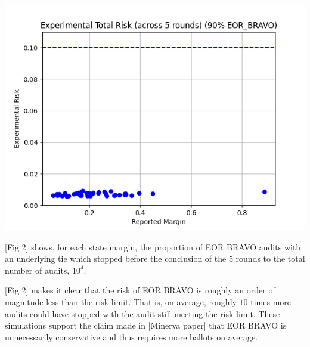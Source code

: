 \documentclass{article}
\begin{document}
\includegraphics[scale=.7]{eor_bravo_90perc_10^4_corrected/total_risk_with_alpha.png}

[Fig 2] shows, for each state margin,
the proportion of EOR BRAVO audits with an underlying
tie which stopped before the conclusion of the $5$ rounds to the 
total number of audits, $10^4$.

[Fig 2] makes it clear that the risk of EOR BRAVO is roughly
an order of magnitude less than the risk limit. 
That is, on average, roughly $10$ times more audits could have stopped 
with the audit still meeting the risk limit.
These simulations support the claim made in [Minerva paper]
that EOR BRAVO is unnecessarily conservative and thus requires
more ballots on average.


\end{document}
